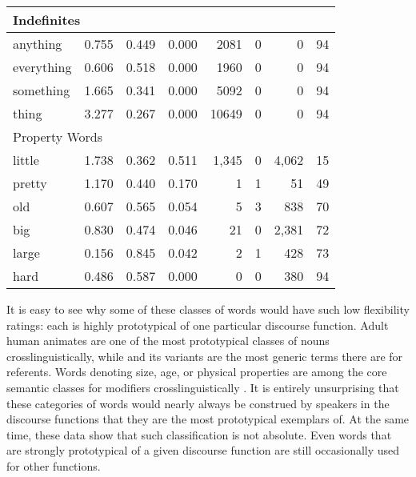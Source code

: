 \begin{table}
\begin{tabular}{ l r r r r r r r }
    \midrule
    \multicolumn{6}{l}{Indefinites}\\
    \midrule
    anything   & 0.755 & 0.449 & 0.000 & 2081  & 0 & 0 & 94\\
    everything & 0.606 & 0.518 & 0.000 & 1960  & 0 & 0 & 94\\
    something  & 1.665 & 0.341 & 0.000 & 5092  & 0 & 0 & 94\\
    thing      & 3.277 & 0.267 & 0.000 & 10649 & 0 & 0 & 94\\

    \midrule
    \multicolumn{6}{l}{Property Words}\\
    \midrule
    little & 1.738 & 0.362 & 0.511 & 1,345 & 0 & 4,062 & 15\\
    pretty & 1.170 & 0.440 & 0.170 &     1 & 1 &    51 & 49\\
    old    & 0.607 & 0.565 & 0.054 &     5 & 3 &   838 & 70\\
    big    & 0.830 & 0.474 & 0.046 &    21 & 0 & 2,381 & 72\\
    large  & 0.156 & 0.845 & 0.042 &     2 & 1 &   428 & 73\\
    hard   & 0.486 & 0.587 & 0.000 &     0 & 0 &   380 & 94\\

    \bottomrule
  \end{tabular}
\end{table}

It is easy to see why some of these classes of words would have such low flexibility ratings: each is highly prototypical of one particular discourse function. Adult human animates are one of the most prototypical classes of nouns crosslinguistically, while  and its variants are the most generic terms there are for referents. Words denoting size, age, or physical properties are among the core semantic classes for modifiers crosslinguistically \parencite{Dixon1977}. It is entirely unsurprising that these categories of words would nearly always be construed by speakers in the discourse functions that they are the most prototypical exemplars of. At the same time, these data show that such classification is not absolute. Even words that are strongly prototypical of a given discourse function are still occasionally used for other functions.

